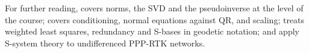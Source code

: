 \documentclass[main.tex]{subfiles}
\begin{document}
For further reading, \textcite{strang2019linear} covers norms, the SVD and the
pseudoinverse at the level of the course; \textcite{higham2002accuracy}
covers conditioning, normal equations against QR, and scaling;
\textcite{teunissen2000adjustment} treats weighted least squares, redundancy
and S-bases in geodetic notation; and \textcite{odijk2016estimability} apply
S-system theory to undifferenced PPP-RTK networks.

\ifSubfilesClassLoaded{\printbibliography}{}
\end{document}
